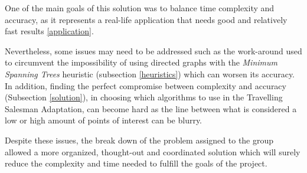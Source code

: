 \documentclass[a4paper, 12pt]{report}
\begin{document}
    One of the main goals of this solution was to balance time complexity and accuracy, as it represents a real-life application that needs good and relatively fast results \ref{application}.
    
    Nevertheless, some issues may need to be addressed such as the work-around used to circumvent the impossibility of using directed graphs with the \textit{Minimum Spanning Trees} heuristic (subsection \ref{heuristics}) which can worsen its accuracy. In addition, finding the perfect compromise between complexity and accuracy (Subsection \ref{solution}), in choosing which algorithms to use in the Travelling Salesman Adaptation, can become hard as the line between what is considered a low or high amount of points of interest can be blurry.
    
    Despite these issues, the break down of the problem assigned to the group allowed a more organized, thought-out and coordinated solution which will surely reduce the complexity and time needed to fulfill the goals of the project.
    
    \pagebreak
    
    \printbibliography
    
\end{document}
